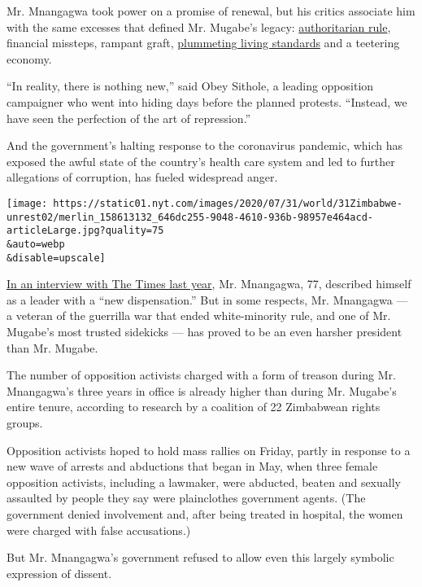 Mr. Mnangagwa took power on a promise of renewal, but his critics
associate him with the same excesses that defined Mr. Mugabe's legacy:
\href{https://www.nytimes.com/2019/01/23/world/africa/zimbabwe-protests-emmerson-mnangagwa.html}{authoritarian
rule}, financial missteps, rampant graft,
\href{https://www.nytimes.com/2019/07/31/world/africa/zimbabwe-water-crisis.html}{plummeting
living standards} and a teetering economy.

``In reality, there is nothing new,'' said Obey Sithole, a leading
opposition campaigner who went into hiding days before the planned
protests. ``Instead, we have seen the perfection of the art of
repression.''

And the government's halting response to the coronavirus pandemic, which
has exposed the awful state of the country's health care system and led
to further allegations of corruption, has fueled widespread anger.

\texttt{[image: https://static01.nyt.com/images/2020/07/31/world/31Zimbabwe-unrest02/merlin\_158613132\_646dc255-9048-4610-936b-98957e464acd-articleLarge.jpg?quality=75\\\&auto=webp\\\&disable=upscale]}

\href{https://www.nytimes.com/2019/08/10/world/africa/zimbabwe-president-emmerson-mnangagwa-mugabe.html?action=click\&module=RelatedLinks\&pgtype=Article}{In
an interview with The Times last year}, Mr. Mnangagwa, 77, described
himself as a leader with a ``new dispensation.'' But in some respects,
Mr. Mnangagwa --- a veteran of the guerrilla war that ended
white-minority rule, and one of Mr. Mugabe's most trusted sidekicks ---
has proved to be an even harsher president than Mr. Mugabe.

The number of opposition activists charged with a form of treason during
Mr. Mnangagwa's three years in office is already higher than during Mr.
Mugabe's entire tenure, according to research by a coalition of 22
Zimbabwean rights groups.

Opposition activists hoped to hold mass rallies on Friday, partly in
response to a new wave of arrests and abductions that began in May, when
three female opposition activists, including a lawmaker, were abducted,
beaten and sexually assaulted by people they say were plainclothes
government agents. (The government denied involvement and, after being
treated in hospital, the women were charged with false accusations.)

But Mr. Mnangagwa's government refused to allow even this largely
symbolic expression of dissent.

